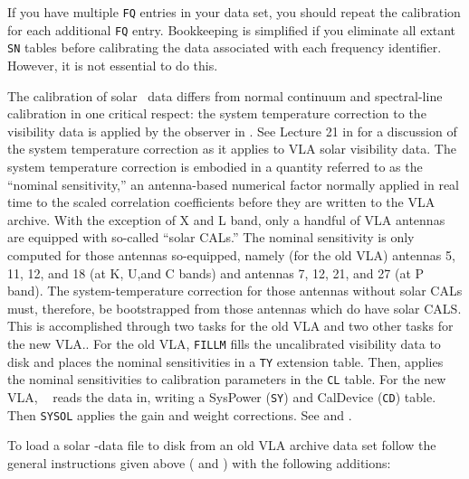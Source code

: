      If you have multiple {\tt FQ} entries in your data set, you
should repeat the calibration for each additional {\tt FQ} entry.
Bookkeeping is simplified if you eliminate all extant {\tt SN} tables
before calibrating the data associated with each frequency identifier.
However, it is not essential to do this.


     The calibration of solar \uv\ data differs from normal continuum
and spectral-line calibration in one critical respect: the system
temperature correction to the visibility data is applied by the
observer in \hbox{\AIPS}.  See Lecture 21 in {\it {}\/} for a discussion of the system
temperature correction as it applies to VLA solar visibility data.
The system temperature correction is embodied in a quantity referred
to as the ``nominal sensitivity,'' an antenna-based numerical factor
normally applied in real time to the scaled correlation coefficients
before they are written to the VLA archive.  With the exception
of X and L band, only a handful of VLA antennas are equipped with
so-called ``solar CALs.''  The nominal sensitivity is only computed
for those antennas so-equipped, namely (for the old VLA) antennas 5,
11, 12, and 18 (at K, U,and C bands) and antennas 7, 12, 21, and 27
(at P band).  The system-temperature correction for those antennas
without solar CALs must, therefore, be bootstrapped from those
antennas which do have solar CALS\@.  This is accomplished through two
tasks for the old VLA and two other tasks for the new VLA\@..  For the
old VLA, {\tt FILLM} fills the uncalibrated visibility data to disk
and places the nominal sensitivities in a {\tt TY} extension table.
Then, {\tt {}} applies the nominal sensitivities to
calibration parameters in the {\tt CL} table.  For the new VLA, {\tt
{}} reads the data in, writing a SysPower ({\tt SY}) and
CalDevice ({\tt CD}) table.  Then {\tt SYSOL} applies the gain and
weight corrections.  See  and .


To load a solar \uv-data file to disk from an old VLA archive data set
follow the general instructions given above ( and
) with the following additions:

